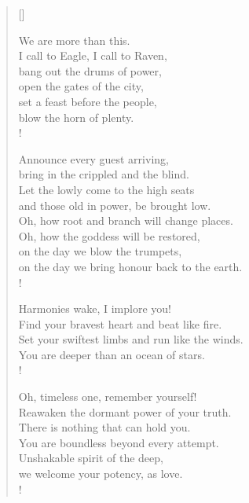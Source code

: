 \fugue

\settowidth{\versewidth}{Set your swiftest limbs and run like the winds.}

\begin{verse}[\versewidth]

We are more than this.\\
I call to Eagle, I call to Raven,\\
bang out the drums of power,\\
open the gates of the city,\\
set a feast before the people,\\
blow the horn of plenty.\\!

Announce every guest arriving,\\
bring in the crippled and the blind.\\
Let the lowly come to the high seats\\
and those old in power, be brought low.\\
Oh, how root and branch will change places.\\
Oh, how the goddess will be restored,\\
on the day we blow the trumpets,\\
on the day we bring honour back to the earth.\\!

Harmonies wake, I implore you!\\
Find your bravest heart and beat like fire.\\
Set your swiftest limbs and run like the winds.\\
You are deeper than an ocean of stars.\\!

Oh, timeless one, remember yourself!\\
Reawaken the dormant power of your truth.\\
There is nothing that can hold you.\\
You are boundless beyond every attempt.\\
Unshakable spirit of the deep,\\
we welcome your potency, as love.\\!

\end{verse}
